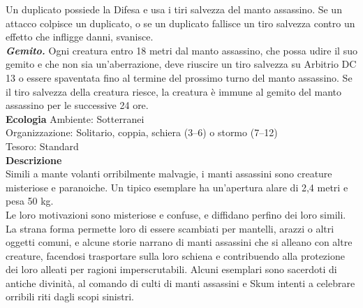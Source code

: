 \begin{multicols}{2}
Un duplicato possiede la Difesa e usa i tiri salvezza del manto assassino. Se un attacco colpisce un duplicato, o se un duplicato fallisce un tiro salvezza contro un effetto che infligge danni, svanisce.\\
\emph{\textbf{Gemito.}} Ogni creatura entro 18 metri dal manto assassino, che possa udire il suo gemito e che non sia un'aberrazione, deve riuscire un tiro salvezza su Arbitrio DC 13 o essere spaventata fino al termine del prossimo turno del manto assassino. Se il tiro salvezza della creatura riesce, la creatura è immune al gemito del manto assassino per le successive 24 ore.\\
\textbf{Ecologia}
Ambiente: Sotterranei\\
Organizzazione: Solitario, coppia, schiera (3–6) o stormo (7–12)\\
Tesoro: Standard\\
\textbf{Descrizione}\\
Simili a mante volanti orribilmente malvagie, i manti assassini sono creature misteriose e paranoiche. Un tipico esemplare ha un’apertura alare di 2,4 metri e pesa 50 kg.\\

Le loro motivazioni sono misteriose e confuse, e diffidano perfino dei loro simili. La strana forma permette loro di essere scambiati per mantelli, arazzi o altri oggetti comuni, e alcune storie narrano di manti assassini che si alleano con altre creature, facendosi trasportare sulla loro schiena e contribuendo alla protezione dei loro alleati per ragioni imperscrutabili. Alcuni esemplari sono sacerdoti di antiche divinità, al comando di culti di manti assassini e Skum intenti a celebrare orribili riti dagli scopi sinistri.\\



\end{multicols}
